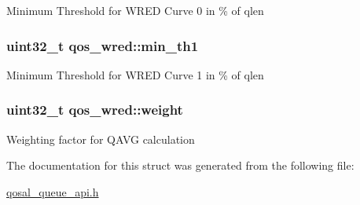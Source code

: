 Minimum Threshold for W\-R\-E\-D Curve 0 in \% of qlen \hypertarget{structqos__wred_a0a66c03609dbfb8e9cd41605c4f1343d}{
\subsubsection[{min\-\_\-th1}]{\setlength{\rightskip}{0pt plus 5cm}uint32\-\_\-t qos\-\_\-wred\-::min\-\_\-th1}}\label{structqos__wred_a0a66c03609dbfb8e9cd41605c4f1343d}
Minimum Threshold for W\-R\-E\-D Curve 1 in \% of qlen \hypertarget{structqos__wred_ad24e5f107f4f64ef4db622e8d456b65c}{
\subsubsection[{weight}]{\setlength{\rightskip}{0pt plus 5cm}uint32\-\_\-t qos\-\_\-wred\-::weight}}\label{structqos__wred_ad24e5f107f4f64ef4db622e8d456b65c}
Weighting factor for Q\-A\-V\-G calculation 

The documentation for this struct was generated from the following file\-:\begin{DoxyCompactItemize}
\item 
\hyperlink{qosal__queue__api_8h}{qosal\-\_\-queue\-\_\-api.\-h}\end{DoxyCompactItemize}
